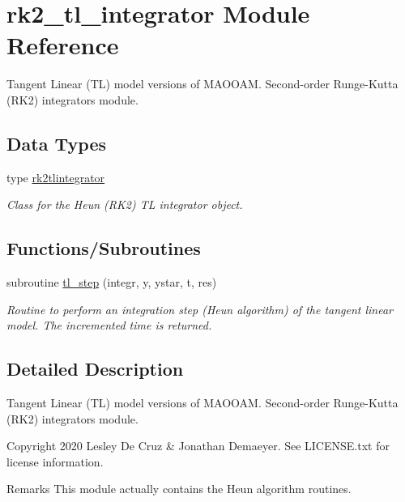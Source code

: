 \hypertarget{namespacerk2__tl__integrator}{}\section{rk2\+\_\+tl\+\_\+integrator Module Reference}
\label{namespacerk2__tl__integrator}


Tangent Linear (TL) model versions of M\+A\+O\+O\+AM. Second-\/order Runge-\/\+Kutta (R\+K2) integrators module.  


\subsection*{Data Types}
\begin{DoxyCompactItemize}
\item 
type \hyperlink{structrk2__tl__integrator_1_1rk2tlintegrator}{rk2tlintegrator}
\begin{DoxyCompactList}\small\item\em Class for the Heun (R\+K2) TL integrator object. \end{DoxyCompactList}\end{DoxyCompactItemize}
\subsection*{Functions/\+Subroutines}
\begin{DoxyCompactItemize}
\item 
subroutine \hyperlink{namespacerk2__tl__integrator_a867845e7a959575d45836326f575e149}{tl\+\_\+step} (integr, y, ystar, t, res)
\begin{DoxyCompactList}\small\item\em Routine to perform an integration step (Heun algorithm) of the tangent linear model. The incremented time is returned. \end{DoxyCompactList}\end{DoxyCompactItemize}


\subsection{Detailed Description}
Tangent Linear (TL) model versions of M\+A\+O\+O\+AM. Second-\/order Runge-\/\+Kutta (R\+K2) integrators module. 

\begin{DoxyCopyright}{Copyright}
2020 Lesley De Cruz \& Jonathan Demaeyer. See L\+I\+C\+E\+N\+S\+E.\+txt for license information. 
\end{DoxyCopyright}
\begin{DoxyRemark}{Remarks}
This module actually contains the Heun algorithm routines. 
\end{DoxyRemark}


